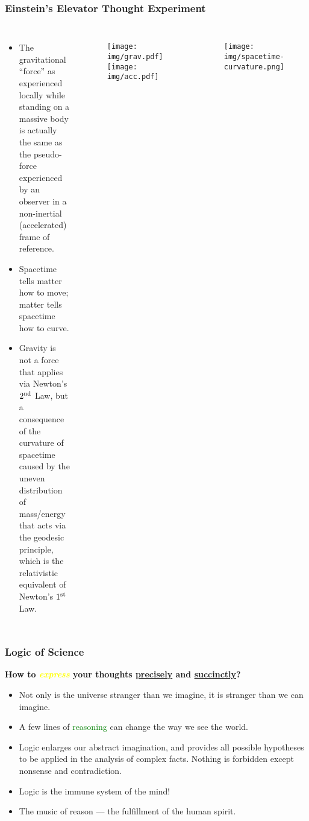 \documentclass[UTF8,11pt,colorlinks,compress,openany]{beamer}%
\begin{document}
\begin{frame}\frametitle{Einstein's Elevator Thought Experiment}
	\begin{columns}\hspace{-9pt}
			\begin{itemize}
				\item The gravitational ``force'' as experienced locally while standing on a massive body is actually the same as the pseudo-force experienced by an observer in a non-inertial (accelerated) frame of reference.
				\item Spacetime tells matter how to move; matter tells spacetime how to curve.
				\item Gravity is not a force that applies via Newton's $2\textsuperscript{nd}$ Law, but a consequence of the curvature of spacetime caused by the uneven distribution of mass/energy that acts via the geodesic principle, which is the relativistic equivalent of Newton's $1\textsuperscript{st}$ Law.
			\end{itemize}
		\vspace{-5pt}
			\begin{figure}
				\colorbox{green!15}{\texttt{[image: img/grav.pdf]}
				\texttt{[image: img/acc.pdf]}}
			\end{figure}
			\begin{figure}
				\texttt{[image: img/spacetime-curvature.png]}
			\end{figure}
	\end{columns}
\end{frame}

\begin{frame}\frametitle{Logic of Science}
	\begin{block}{}
		\begin{center}
			\textbf{\large{How to \textcolor{yellow}{\textit{express}} your thoughts \underline{precisely} and \underline{succinctly}?}}
		\end{center}
	\end{block}
	\begin{itemize}
		\item Not only is the universe stranger than we imagine, it is stranger than we can imagine.
		\item A few lines of \textcolor{green}{reasoning} can change the way we see the world.
		\item Logic enlarges our abstract imagination, and provides all possible hypotheses to be applied in the analysis of complex facts. Nothing is forbidden except nonsense and contradiction.
		\item Logic is the immune system of the mind!
		\item The music of reason --- the fulfillment of the human spirit.
	\end{itemize}
\end{frame}
\end{document}
